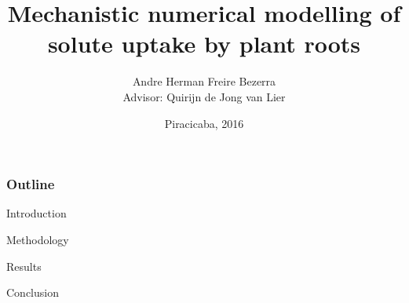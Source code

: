 \documentclass[compress]{beamer}  %
\title{Mechanistic numerical modelling of solute uptake by plant roots}
\author[Bezerra, A.H.F.]
{
Andre Herman Freire Bezerra\\
{\scriptsize Advisor: Quirijn de Jong van Lier}
}
\institute{University of S\~ao Paulo}
\date
{Piracicaba, 2016}
\begin{document}
\frame{\titlepage}

\begin{frame}
\frametitle{Outline}
Introduction

Methodology

Results

Conclusion
\end{frame}







{\scriptsize 
}
\end{document}
